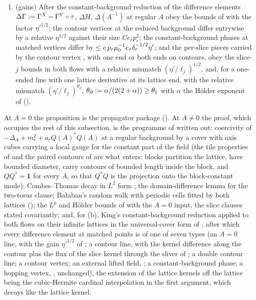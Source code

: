 \begin{proposition}
\begin{enumerate}[label=\textup{(\alph*)},leftmargin=*]
\item \textup{(gains)} After the constant-background reduction of  the difference elements $\Delta\Gamma:=\Gamma^X-\Gamma^Y\circ\tau$, $\Delta H$, $\Delta(A^{-1})$ at regular $A$ obey the bounds of  with the factor $\eta'^{1/2}$; the contour vertices \cite[(3.24)--(3.26)]{K1} at the reduced background differ entrywise by a relative $\eta^{1/2}$ against their size $Ce_rp_r^2$; the constant-background phases \cite[(3.46)]{K1} at matched vertices differ by $\le e\,p_r\mu_0^{-1}c_\tau\delta_r^{-1/2}\eta'$; and the per-slice pieces carried by the contour vertex \cite[(3.26)--(3.27)]{K1}, with one end or both ends on contours, obey the slice-$j$ bounds \cite[(3.63)--(3.65)]{K1} in both flows with a relative mismatch $(\eta'/\ell_j)^{1/2}$, and, for a one-ended line with one lattice derivative at its lattice end, with the relative mismatch $(\eta'/\ell_j)^{\theta_\partial}$, $\theta_\partial:=\alpha/(2(2+\alpha))\ge\theta_1$ with $\alpha$ the H\"older exponent of \cite[(3.8)]{K1} ().
\end{enumerate}
\end{proposition}
At $A=0$ the proposition is the propagator package (). At $A\ne0$ the proof, which occupies the rest of this subsection, is the programme of \cite[\S5.3]{K2} written out: coercivity of $-\Delta_A+m_r^2+a_rQ(A)^*Q(A)$ at a regular background by a cover with axis cubes carrying a local gauge for the constant part of the field (the tile properties of  and the paired contours of  are what enters: blocks partition the lattice, have bounded diameter, carry contours of bounded length inside the block, and $QQ^*=\mathbf 1$ for every $A$, so that $Q^*Q$ is the projection onto the block-constant mode); Combes--Thomas decay in $L^2$ form \cite{CT73}; the domain-difference lemma for the two-torus clause; Ba{\l}aban's random walk \cite[\S2]{Ba4} with periodic cells fitted by both lattices (\cite[(5.55)--(5.56)]{K2}); the $L^p$ and H\"older bounds of \cite[Lemma~2.2]{Ba4} with the $A=0$ input, the slice clauses stated covariantly; and, for (b), King's constant-background reduction \cite[(3.43)--(3.55)]{K1} applied to both flows on their infinite lattices in the universal-cover form of , after which every difference element at matched points is of one of seven types (an $A=0$ line, with the gain $\eta'^{1/2}$ of ; a contour line, with the kernel difference along the contour plus the flux of the slice kernel through the sliver of ; a double contour line; a contour vertex; an external lifted field, ; a constant-background phase; a hopping vertex, , unchanged), the extension of the lattice kernels off the lattice being the cubic-Hermite cardinal interpolation in the first argument, which decays like the lattice kernel.

